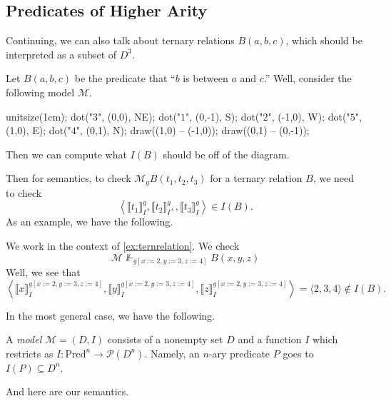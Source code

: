 \subsection{Predicates of Higher Arity}
Continuing, we can also talk about ternary relations $B(a,b,c)$, which should be interpreted as a subset of $D^3$.
\begin{example} \label{ex:ternrelation}
	Let $B(a,b,c)$ be the predicate that ``$b$ is between $a$ and $c$.'' Well, consider the following model $\mathcal M$.
	\begin{center}
		\begin{asy}
			unitsize(1cm);
			dot("$3$", (0,0), NE);
			dot("$1$", (0,-1), S);
			dot("$2$", (-1,0), W);
			dot("$5$", (1,0), E);
			dot("$4$", (0,1), N);
			draw((1,0) -- (-1,0));
			draw((0,1) -- (0,-1));
		\end{asy}
	\end{center}
	Then we can compute what $I(B)$ should be off of the diagram.
\end{example}
Then for semantics, to check $\mathcal M_gB(t_1,t_2,t_3)$ for a ternary relation $B$, we need to check
\[\left\langle\llbracket t_1\rrbracket_I^g,\llbracket t_2\rrbracket_I^g,,\llbracket t_3\rrbracket_I^g\right\rangle\in I(B).\]
As an example, we have the following.
\begin{example}
	We work in the context of \autoref{ex:ternrelation}. We check
	\[\mathcal M\nVdash_{g[x:=2,y:=3,z:=4]}B(x,y,z)\]
	Well, we see that
	\[\left\langle\llbracket x\rrbracket_I^{g[x:=2,y:=3,z:=4]},\llbracket y\rrbracket_I^{g[x:=2,y:=3,z:=4]},\llbracket z\rrbracket_I^{g[x:=2,y:=3,z:=4]}\right\rangle=\langle2,3,4\rangle\notin I(B).\]
\end{example}
In the most general case, we have the following.
\begin{defi}[Model]
	A \textit{model} $\mathcal M=(D,I)$ consists of a nonempty set $D$ and a function $I$ which restricts as $I:\mathrm{Pred}^n\to\mathcal P\left(D^n\right)$. Namely, an $n$-ary predicate $P$ goes to $I(P)\subseteq D^n$.
\end{defi}
And here are our semantics.

